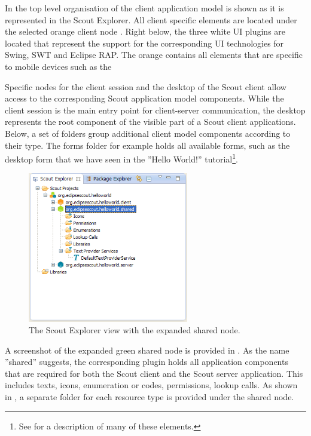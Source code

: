 \documentclass[a4paper,10pt,twoside]{book}
\begin{document}
In  the top level organisation of the client application model is shown as it is represented in the Scout Explorer.
All client specific elements are located under the selected orange client node . 
Right below, the three white UI plugins are located that represent the support for the corresponding UI technologies for Swing, SWT and Eclipse RAP. 
The orange  contains all elements that are specific to mobile devices such as the 

Specific nodes for the client session and the desktop of the Scout client allow access to the corresponding Scout application model components. 
While the client session is the main entry point for client-server communication, the desktop represents the root component of the visible part of a Scout client applications. 
Below, a set of folders group additional client model components according to their type. 
The forms folder for example holds all available forms, such as the desktop form that we have seen in the ''Hello World!'' tutorial\footnote{
See  for a description of many of these elements.
}. 

\begin{figure}
\includegraphics[width=7cm]{explorer_shared.png} 
\caption{The Scout Explorer view with the expanded shared node.}
\end{figure}

A screenshot of the expanded green shared node  is provided in . 
As the name ''shared'' suggests, the corresponding plugin holds all application components that are required for both the Scout client and the Scout server application. 
This includes texts, icons, enumeration or codes, permissions, lookup calls. 
As shown in , a separate folder for each resource type is provided under the shared node.
 
\end{document}
